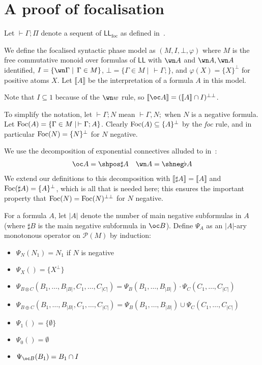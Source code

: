 \documentclass[11pt]{article}
\author{Naïm Favier}
\newcommand\LL{\textsf{LL}}
\newcommand\LLfoc{{\LL_\text{foc}}}
\newcommand\size[1]{{\lvert #1 \rvert}}
\newcommand\sem[1]{{\llbracket #1 \rrbracket}}
\newcommand\biperp{{\perp\perp}}
\newcommand\Foc{\textup{Foc}}
\begin{document}
\section{A proof of focalisation}

Let $\vdash \Gamma; \Pi$ denote a sequent of $\LLfoc$ as defined in~\cite{laurent}.

We define the focalised syntactic phase model as $(M, I, \bot, \varphi)$ where $M$ is the
free commutative monoid over formulas of $\LL$ with $\wn A$ and $\wn A, \wn A$ identified,
$I = \{\wn \Gamma\mid\,\Gamma\in M\}$, $\bot = \{\Gamma \in M \mid\,\vdash \Gamma;\}$, and $\varphi(X) = \{X\}^\perp$
for positive atoms $X$. Let $\sem{A}$ be the interpretation of a formula $A$ in this model.

Note that $I \subseteq 1$ because of the $\wn w$ rule, so $\sem{\oc A} = (\sem{A} \cap I)^\biperp$.

To simplify the notation, let $\vdash \Gamma; N$ mean $\vdash \Gamma, N;$ when $N$ is a negative formula.
Let $\Foc(A) = {\{\Gamma \in M \mid\, \vdash \Gamma; A\}}$.
Clearly $\Foc(A) \subseteq \{A\}^\perp$ by the \textit{foc} rule, and in particular $\Foc(N) = \{N\}^\perp$ for $N$ negative.

We use the decomposition of exponential connectives alluded to in~\cite[section 4.1]{laurent}: \begin{align*}
    \oc A = \shpos\sharp A && \wn A = \shneg\flat A
\end{align*}
We extend our definitions to this decomposition with $\sem{\sharp A} = \sem{A}$ and $\Foc(\sharp A) = \{A\}^\perp$,
which is all that is needed here; this ensures the important property that $\Foc(N) = \Foc(N)^\biperp$ for $N$ negative.

For a formula $A$, let $\size{A}$ denote the number of main negative subformulas in $A$
(where $\sharp B$ is the main negative subformula in $\oc B$).
Define $\Psi_A$ as an $\size{A}$-ary monotonous operator on $\mathcal P(M)$ by induction:
\begin{itemize}
    \item $\Psi_N(N_1) = N_1$ if $N$ is negative
    \item $\Psi_X() = \{X^\perp\}$
    \item $\Psi_{B \otimes C}(B_1, \dots, B_\size{B}, C_1, \dots, C_\size{C}) = \Psi_B(B_1, \dots, B_\size{B}) \cdot \Psi_C(C_1, \dots, C_\size{C})$
    \item $\Psi_{B \oplus C}(B_1, \dots, B_\size{B}, C_1, \dots, C_\size{C}) = \Psi_B(B_1, \dots, B_\size{B}) \cup \Psi_C(C_1, \dots, C_\size{C})$
    \item $\Psi_1() = \{\emptyset\}$
    \item $\Psi_0() = \emptyset$
    \item $\Psi_{\oc B}(B_1) = B_1 \cap I$
\end{itemize}
\end{document}
